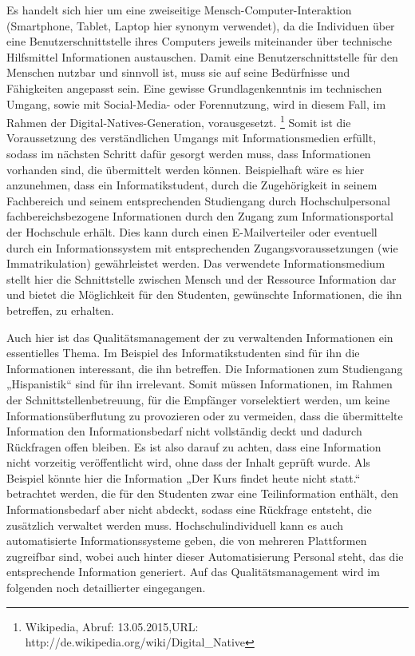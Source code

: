 \documentclass{article}
\begin{document}
Es handelt sich hier um eine zweiseitige Mensch-Computer-Interaktion (Smartphone, Tablet, Laptop hier synonym
verwendet), da die Individuen über eine Benutzerschnittstelle ihres Computers jeweils miteinander über technische
Hilfsmittel Informationen austauschen. Damit eine Benutzerschnittstelle für den Menschen nutzbar und sinnvoll ist, muss
sie auf seine Bedürfnisse und Fähigkeiten angepasst sein. Eine gewisse Grundlagenkenntnis im technischen Umgang, sowie
mit Social-Media- oder Forennutzung, wird in diesem Fall, im Rahmen der Digital-Natives-Generation, vorausgesetzt.
\footnote{Wikipedia, Abruf: 13.05.2015,URL: http://de.wikipedia.org/wiki/Digital\_Native}\newline
Somit ist die Voraussetzung des verständlichen Umgangs mit Informationsmedien erfüllt, sodass im nächsten Schritt dafür
gesorgt werden muss, dass Informationen vorhanden sind, die übermittelt werden können. Beispielhaft wäre es hier
anzunehmen, dass ein Informatikstudent, durch die Zugehörigkeit in seinem Fachbereich und seinem entsprechenden
Studiengang durch Hochschulpersonal fachbereichsbezogene Informationen durch den Zugang zum Informationsportal der
Hochschule erhält. Dies kann durch einen E-Mailverteiler oder eventuell durch ein Informationssystem mit entsprechenden
Zugangsvoraussetzungen (wie Immatrikulation) gewährleistet werden. Das verwendete Informationsmedium stellt hier die
Schnittstelle zwischen Mensch und der Ressource Information dar und bietet die Möglichkeit für den Studenten,
gewünschte Informationen, die ihn betreffen, zu erhalten.

Auch hier ist das Qualitätsmanagement der zu verwaltenden Informationen ein essentielles Thema. Im Beispiel des
Informatikstudenten sind für ihn die Informationen interessant, die ihn betreffen. Die Informationen zum Studiengang
„Hispanistik“ sind für ihn irrelevant. Somit müssen Informationen, im Rahmen der Schnittstellenbetreuung, für die
Empfänger vorselektiert werden, um keine Informationsüberflutung zu provozieren oder zu vermeiden, dass die
übermittelte Information den Informationsbedarf nicht vollständig deckt und dadurch Rückfragen offen bleiben. Es ist
also darauf zu achten, dass eine Information nicht vorzeitig veröffentlicht wird, ohne dass der Inhalt geprüft wurde.
Als Beispiel könnte hier die Information „Der Kurs findet heute nicht statt.“ betrachtet werden, die für den Studenten
zwar eine Teilinformation enthält, den Informationsbedarf aber nicht abdeckt, sodass eine Rückfrage entsteht, die
zusätzlich verwaltet werden muss. Hochschulindividuell kann es auch automatisierte Informationssysteme geben, die von
mehreren Plattformen zugreifbar sind, wobei auch hinter dieser Automatisierung Personal steht, das die entsprechende
Information generiert. Auf das Qualitätsmanagement wird im folgenden noch detaillierter eingegangen.
\end{document}
